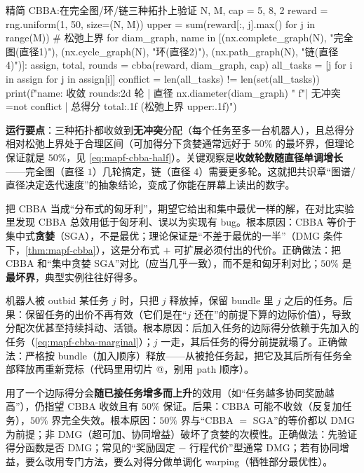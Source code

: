 \begin{codebox}[Python]{精简 CBBA:在完全图/环/链三种拓扑上验证}
N, M, cap = 5, 8, 2
reward = rng.uniform(1, 50, size=(N, M))
upper = sum(reward[:, j].max() for j in range(M))          # 松弛上界
for diam_graph, name in [(nx.complete_graph(N), "完全图(直径1)"),
                         (nx.cycle_graph(N), "环(直径2)"), (nx.path_graph(N), "链(直径4)")]:
    assign, total, rounds = cbba(reward, diam_graph, cap)
    all_tasks = [j for i in assign for j in assign[i]]
    conflict = len(all_tasks) != len(set(all_tasks))
    print(f"{name}: 收敛 {rounds:2d} 轮 | 直径 {nx.diameter(diam_graph)} "
          f"| 无冲突={not conflict} | 总得分 {total:.1f} (松弛上界 {upper:.1f})")
\end{codebox}

\textbf{运行要点}：三种拓扑都收敛到\textbf{无冲突}分配（每个任务至多一台机器人），且总得分相对松弛上界处于合理区间（可加得分下贪婪通常远好于 $50\%$ 的最坏界，但理论保证就是 $50\%$，见 \cref{eq:mapf-cbba-half}）。关键观察是\textbf{收敛轮数随直径单调增长}——完全图（直径 $1$）几轮搞定，链（直径 $4$）需要更多轮。这就把共识章“图谱/直径决定迭代速度”的抽象结论，变成了你能在屏幕上读出的数字。

\begin{pitfall}
把 CBBA 当成“分布式的匈牙利”，期望它给出和集中最优一样的解，在对比实验里发现 CBBA 总效用低于匈牙利、误以为实现有 bug。根本原因：CBBA 等价于集中式\textbf{贪婪}（SGA），不是最优；理论保证是“不差于最优的一半”（DMG 条件下，\cref{thm:mapf-cbba}），这是分布式 $+$ 可扩展必须付出的代价。正确做法：把 CBBA 和“集中贪婪 SGA”对比（应当几乎一致），而不是和匈牙利对比；$50\%$ 是\textbf{最坏界}，典型实例往往好得多。
\end{pitfall}

\begin{pitfall}
机器人被 outbid 某任务 $j$ 时，只把 $j$ 释放掉，保留 bundle 里 $j$ 之后的任务。后果：保留任务的出价不再有效（它们是在“$j$ 还在”的前提下算的边际价值），导致分配次优甚至持续抖动、活锁。根本原因：后加入任务的边际得分依赖于先加入的任务（\cref{eq:mapf-cbba-marginal}）；$j$ 一走，其后任务的得分前提就塌了。正确做法：严格按 bundle（加入顺序）释放——从被抢任务起，把它及其后所有任务全部释放再重新竞标（代码里用切片 @，别用 path 顺序）。
\end{pitfall}

\begin{pitfall}
用了一个边际得分会\textbf{随已接任务增多而上升}的效用（如“任务越多协同奖励越高”），仍指望 CBBA 收敛且有 $50\%$ 保证。后果：CBBA 可能不收敛（反复加任务），$50\%$ 界完全失效。根本原因：$50\%$ 界与“CBBA $=$ SGA”的等价都以 DMG 为前提；非 DMG（超可加、协同增益）破坏了贪婪的次模性。正确做法：先验证得分函数是否 DMG；常见的“奖励固定 $-$ 行程代价”型通常 DMG；若有协同增益，要么改用专门方法，要么对得分做单调化 warping（牺牲部分最优性）。
\end{pitfall}


